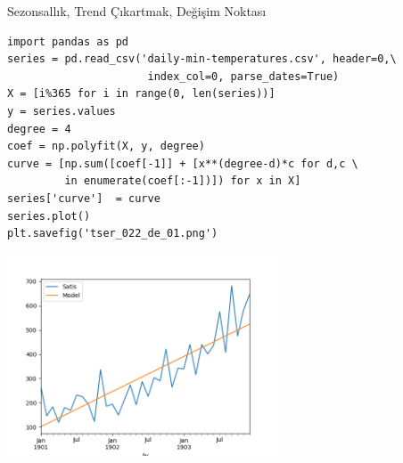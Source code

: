 \documentclass[12pt,fleqn]{article}\usepackage{../../common}
\begin{document}
Sezonsallık, Trend Çıkartmak, Değişim Noktası


\begin{verbatim}
import pandas as pd
series = pd.read_csv('daily-min-temperatures.csv', header=0,\
                      index_col=0, parse_dates=True)
X = [i%365 for i in range(0, len(series))]
y = series.values
degree = 4
coef = np.polyfit(X, y, degree)
curve = [np.sum([coef[-1]] + [x**(degree-d)*c for d,c \
         in enumerate(coef[:-1])]) for x in X]
series['curve']  = curve
series.plot()
plt.savefig('tser_022_de_01.png')
\end{verbatim}






\includegraphics[height=6cm]{tser_022_de_01.png}




 
\end{document}
